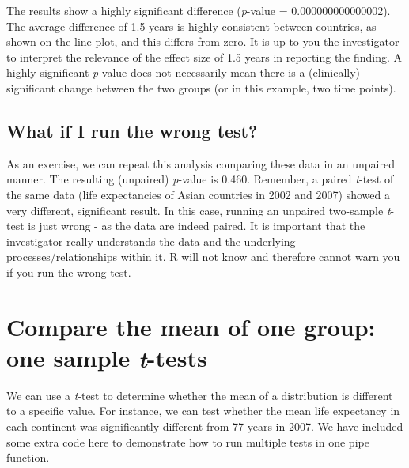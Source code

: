 \documentclass[
  12pt,
  krantz2]{krantz}
\begin{document}

The results show a highly significant difference (\emph{p}-value = 0.000000000000002).
The average difference of 1.5 years is highly consistent between countries, as shown on the line plot, and this differs from zero.
It is up to you the investigator to interpret the relevance of the effect size of 1.5 years in reporting the finding.
A highly significant \emph{p}-value does not necessarily mean there is a (clinically) significant change between the two groups (or in this example, two time points).

\hypertarget{what-if-i-run-the-wrong-test}{%
\subsection{What if I run the wrong test?}\label{what-if-i-run-the-wrong-test}}

As an exercise, we can repeat this analysis comparing these data in an unpaired manner.
The resulting (unpaired) \emph{p}-value is 0.460.
Remember, a paired \emph{t}-test of the same data (life expectancies of Asian countries in 2002 and 2007) showed a very different, significant result.
In this case, running an unpaired two-sample \emph{t}-test is just wrong - as the data are indeed paired.
It is important that the investigator really understands the data and the underlying processes/relationships within it.
R will not know and therefore cannot warn you if you run the wrong test.

\hypertarget{compare-the-mean-of-one-group-one-sample-t-tests}{%
\section{\texorpdfstring{Compare the mean of one group: one sample \emph{t}-tests}{Compare the mean of one group: one sample t-tests}}\label{compare-the-mean-of-one-group-one-sample-t-tests}}


We can use a \emph{t}-test to determine whether the mean of a distribution is different to a specific value.
For instance, we can test whether the mean life expectancy in each continent was significantly different from 77 years in 2007.
We have included some extra code here to demonstrate how to run multiple tests in one pipe function.
\end{document}
